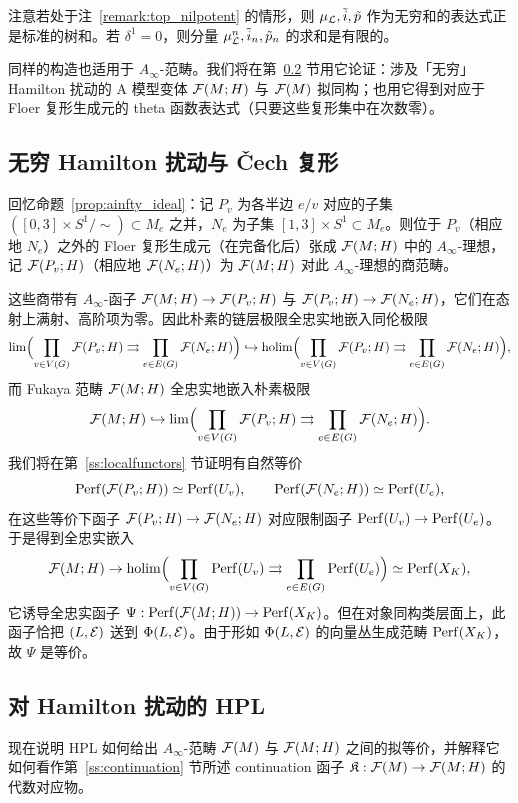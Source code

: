 注意若处于注~\ref{remark:top_nilpotent} 的情形，则 $\mu_{\mathcal{L}},\tilde{i},\tilde{p}$ 作为无穷和的表达式正是标准的树和。若 $\delta^1=0$，则分量 $\mu_{\mathcal{L}}^n,\tilde{i}_n,\tilde{p}_n$ 的求和是有限的。

同样的构造也适用于 $A_{\infty}$-范畴。我们将在第~\ref{ss:HPLFloer} 节用它论证：涉及「无穷」Hamilton 扰动的 A 模型变体 $\mathcal{F}(M;H)$ 与 $\mathcal{F}(M)$ 拟同构；也用它得到对应于 Floer 复形生成元的 theta 函数表达式（只要这些复形集中在次数零）。

\subsection{无穷 Hamilton 扰动与 \v{C}ech 复形}\label{ss:cech}

回忆命题~\ref{prop:ainfty_ideal}：记 $P_v$ 为各半边 $e/v$ 对应的子集 $([0,3]\times S^1/\!\sim)\subset M_e$ 之并，$N_e$ 为子集 $[1,3]\times S^1\subset M_e$。则位于 $P_v$（相应地 $N_e$）之外的 Floer 复形生成元（在完备化后）张成 $\mathcal{F}(M;H)$ 中的 $A_\infty$-理想，记 $\mathcal{F}(P_v;H)$（相应地 $\mathcal{F}(N_e;H)$）为 $\mathcal{F}(M;H)$ 对此 $A_\infty$-理想的商范畴。

这些商带有 $A_\infty$-函子 $\mathcal{F}(M;H)\to \mathcal{F}(P_v;H)$ 与 $\mathcal{F}(P_v;H)\to \mathcal{F}(N_e;H)$，它们在态射上满射、高阶项为零。因此朴素的链层极限全忠实地嵌入同伦极限
\[
\lim\Bigl(\prod_{v\in V(G)}\mathcal{F}(P_v;H)\rightrightarrows\prod_{e\in E(G)}\mathcal{F}(N_e;H)\Bigr)
\hookrightarrow
\operatorname*{holim}\Bigl(\prod_{v\in V(G)}\mathcal{F}(P_v;H)\rightrightarrows\prod_{e\in E(G)}\mathcal{F}(N_e;H)\Bigr),
\]
而 Fukaya 范畴 $\mathcal{F}(M;H)$ 全忠实地嵌入朴素极限
\[
\mathcal{F}(M;H)\hookrightarrow \lim\Bigl(\prod_{v\in V(G)}\mathcal{F}(P_v;H)\rightrightarrows\prod_{e\in E(G)}\mathcal{F}(N_e;H)\Bigr).
\]
我们将在第~\ref{ss:localfunctors} 节证明有自然等价
\[
\operatorname{Perf}(\mathcal{F}(P_v;H))\simeq \operatorname{Perf}(U_v),\qquad \operatorname{Perf}(\mathcal{F}(N_e;H))\simeq \operatorname{Perf}(U_e),
\]
在这些等价下函子 $\mathcal{F}(P_v;H)\to \mathcal{F}(N_e;H)$ 对应限制函子 $\operatorname{Perf}(U_v)\to \operatorname{Perf}(U_e)$。于是得到全忠实嵌入
\[
\mathcal{F}(M;H)\to\operatorname*{holim}\Bigl(\prod_{v\in V(G)}\operatorname{Perf}(U_v)\rightrightarrows\prod_{e\in E(G)}\operatorname{Perf}(U_e)\Bigr)\simeq \operatorname{Perf}(X_K),
\]
它诱导全忠实函子 $\Psi:\operatorname{Perf}(\mathcal{F}(M;H))\to \operatorname{Perf}(X_K)$。但在对象同构类层面上，此函子恰把 $(L,\mathcal{E})$ 送到 $\Phi(L,\mathcal{E})$。由于形如 $\Phi(L,\mathcal{E})$ 的向量丛生成范畴 $\operatorname{Perf}(X_K)$，故 $\Psi$ 是等价。

\subsection{对 Hamilton 扰动的 HPL}\label{ss:HPLFloer}

现在说明 HPL 如何给出 $A_{\infty}$-范畴 $\mathcal{F}(M)$ 与 $\mathcal{F}(M;H)$ 之间的拟等价，并解释它如何看作第~\ref{ss:continuation} 节所述 continuation 函子 $\mathfrak{K}:\mathcal{F}(M)\to \mathcal{F}(M;H)$ 的代数对应物。

